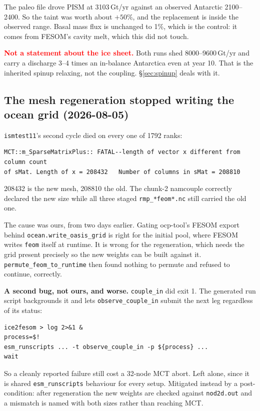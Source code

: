 \documentclass[11pt,a4paper]{article}
\newcommand{\code}[1]{\texttt{\small #1}}
\begin{document}
\noindent
The paleo file drove PISM at 3103\,Gt/yr against an observed Antarctic 2100--2400. So the taint was
worth about $+50\%$, and the replacement is inside the observed range. Basal mass flux is unchanged
to 1\%, which is the control: it comes from FESOM's cavity melt, which this did not touch.

\medskip\noindent
\textcolor{red}{\textbf{Not a statement about the ice sheet.}} Both runs shed 8000--9600\,Gt/yr and
carry a discharge 3--4 times an in-balance Antarctica even at year 10. That is the inherited
spinup relaxing, not the coupling. \S\ref{sec:spinup} deals with it.

\subsection{The mesh regeneration stopped writing the ocean grid (2026-08-05)}
\label{sec:regenbug}

\code{ismtest11}'s second cycle died on every one of 1792 ranks:

\begin{verbatim}
MCT::m_SparseMatrixPlus:: FATAL--length of vector x different from column count
of sMat. Length of x = 208432   Number of columns in sMat = 208810
\end{verbatim}

208432 is the new mesh, 208810 the old. The chunk-2 namcouple correctly declared the new size while
all three staged \code{rmp\_*feom*.nc} still carried the old one.

The cause was ours, from two days earlier. Gating ocp-tool's FESOM export behind
\code{ocean.write\_oasis\_grid} is right for the initial pool, where FESOM writes \code{feom} itself
at runtime. It is wrong for the regeneration, which needs the grid present precisely so the new
weights can be built against it. \code{permute\_feom\_to\_runtime} then found nothing to permute and
refused to continue, correctly.

\medskip\noindent
\textbf{A second bug, not ours, and worse.} \code{couple\_in} did exit 1. The generated run script
backgrounds it and lets \code{observe\_couple\_in} submit the next leg regardless of its status:

\begin{verbatim}
ice2fesom > log 2>&1 &
process=$!
esm_runscripts ... -t observe_couple_in -p ${process} ...
wait
\end{verbatim}

So a cleanly reported failure still cost a 32-node MCT abort. Left alone, since it is shared
\code{esm\_runscripts} behaviour for every setup. Mitigated instead by a post-condition: after
regeneration the new weights are checked against \code{nod2d.out} and a mismatch is named with both
sizes rather than reaching MCT.
\end{document}
